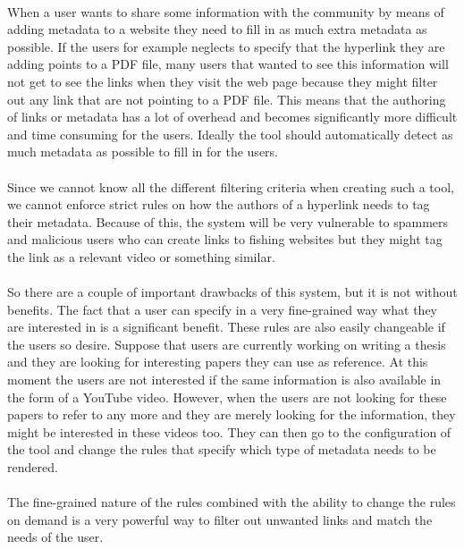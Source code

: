 		\paragraph{}
		When a user wants to share some information with the community by means of adding metadata to a website they need to fill in as much extra metadata as possible. If the users for example neglects to specify that the hyperlink they are adding points to a PDF file, many users that wanted to see this information will not get to see the links when they visit the web page because they might filter out any link that are not pointing to a PDF file. This means that the authoring of links or metadata has a lot of overhead and becomes significantly more difficult and time consuming for the users. Ideally the tool should automatically detect as much metadata as possible to fill in for the users.
		\paragraph{}
		Since we cannot know all the different filtering criteria when creating such a tool, we cannot enforce strict rules on how the authors of a hyperlink needs to tag their metadata. Because of this, the system will be very vulnerable to spammers and malicious users who can create links to fishing websites but they might tag the link as a relevant video or something similar.
		\paragraph{}
		So there are a couple of important drawbacks of this system, but it is not without benefits. The fact that a user can specify in a very fine-grained way what they are interested in is a significant benefit. These rules are also easily changeable if the users so desire. Suppose that users are currently working on writing a thesis and they are looking for interesting papers they can use as reference. At this moment the users are not interested if the same information is also available in the form of a YouTube video. However, when the users are not looking for these papers to refer to any more and they are merely looking for the information, they might be interested in these videos too. They can then go to the configuration of the tool and change the rules that specify which type of metadata needs to be rendered.
		\paragraph{}
		The fine-grained nature of the rules combined with the ability to change the rules on demand is a very powerful way to filter out unwanted links and match the needs of the user.

